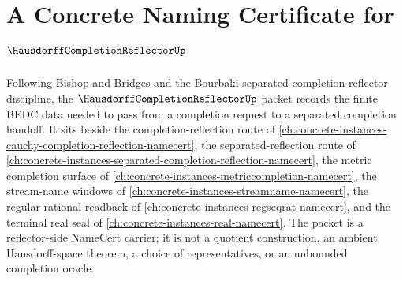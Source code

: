 \chapter{A Concrete Naming Certificate for $\HausdorffCompletionReflectorUp$}
\label{ch:concrete-instances-hausdorff-completion-reflector-namecert}

Following Bishop and Bridges and the Bourbaki separated-completion reflector discipline, the $\HausdorffCompletionReflectorUp$ packet records the finite BEDC data needed to pass from a completion request to a separated completion handoff. It sits beside the completion-reflection route of \autoref{ch:concrete-instances-cauchy-completion-reflection-namecert}, the separated-reflection route of \autoref{ch:concrete-instances-separated-completion-reflection-namecert}, the metric completion surface of \autoref{ch:concrete-instances-metriccompletion-namecert}, the stream-name windows of \autoref{ch:concrete-instances-streamname-namecert}, the regular-rational readback of \autoref{ch:concrete-instances-regseqrat-namecert}, and the terminal real seal of \autoref{ch:concrete-instances-real-namecert}. The packet is a reflector-side NameCert carrier; it is not a quotient construction, an ambient Hausdorff-space theorem, a choice of representatives, or an unbounded completion oracle.

